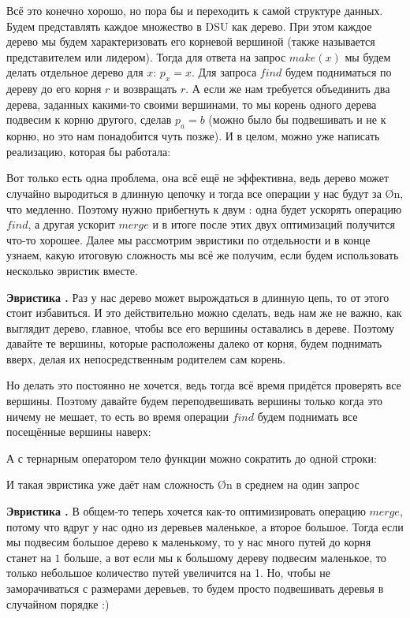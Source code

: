 Всё это конечно хорошо, но пора бы и переходить к самой структуре данных. Будем представлять каждое множество в DSU как дерево. При этом каждое дерево мы будем характеризовать его корневой вершиной (также называется представителем или лидером). Тогда для ответа на запрос $make(x)$ мы будем делать отдельное дерево для $x$: $p_x = x$. Для запроса $find$ будем подниматься по дереву до его корня $r$ и возвращать $r$. А если же нам требуется объединить два дерева, заданных какими-то своими вершинами, то мы корень одного дерева подвесим к корню другого, сделав $p_a = b$ (можно было бы подвешивать и не к корню, но это нам понадобится чуть позже). И в целом, можно уже написать реализацию, которая бы работала:


Вот только есть одна проблема, она всё ещё не эффективна, ведь дерево может случайно выродиться в длинную цепочку и тогда все операции у нас будут за \O{n}, что медленно. Поэтому нужно прибегнуть к двум : одна будет ускорять операцию $find$, а другая ускорит $merge$ и в итоге после этих двух оптимизаций получится что-то хорошее. Далее мы рассмотрим эвристики по отдельности и в конце узнаем, какую итоговую сложность мы всё же получим, если будем использовать несколько эвристик вместе.

\textbf{Эвристика .} Раз у нас дерево может вырождаться в длинную цепь, то от этого стоит избавиться. И это действительно можно сделать, ведь нам же не важно, как выглядит дерево, главное, чтобы все его вершины оставались в дереве. Поэтому давайте те вершины, которые расположены далеко от корня, будем поднимать вверх, делая их непосредственным родителем сам корень.

Но делать это постоянно не хочется, ведь тогда всё время придётся проверять все вершины. Поэтому давайте будем переподвешивать вершины только когда это ничему не мешает, то есть во время операции $find$ будем поднимать все посещённые вершины наверх:


А с тернарным оператором тело функции можно сократить до одной строки:


И такая эвристика уже даёт нам сложность \O{\log n} в среднем на один запрос

\textbf{Эвристика .} В общем-то теперь хочется как-то оптимизировать операцию $merge$, потому что вдруг у нас одно из деревьев маленькое, а второе большое. Тогда если мы подвесим большое дерево к маленькому, то у нас много путей до корня станет на $1$ больше, а вот если мы к большому дереву подвесим маленькое, то только небольшое количество путей увеличится на 1. Но, чтобы не заморачиваться с размерами деревьев, то будем просто подвешивать деревья в случайном порядке :)

